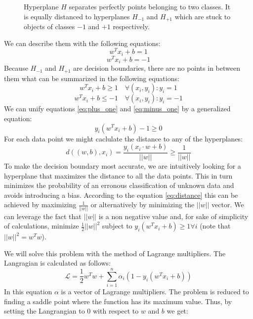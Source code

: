 \begin{figure}[htbp]
  \centering
  
  \caption{Hyperplane $H$ separates perfectly points belonging to two classes. It is equally distanced to hyperplanes $H_{-1}$ and $H_{+1}$ which are stuck to objects of classes $-1$ and $+1$ respectively.}
  \label{fig:two_hyperplanes}
\end{figure}


We can describe them with the following equations:
\begin{equation}
w^T x_i+b = 1
\end{equation}
\begin{equation}
w^T x_i+b = -1
\end{equation}
Because $H_{-1}$ and $H_{+1}$ are decision boundaries, there are no points in between them what can be summarized in the following equations:
\begin{equation} \label{eq:plus_one}
w^T x_i+b \ge 1 \quad \forall \left(x_i, y_i\right) : y_i=1
\end{equation}
\begin{equation} \label{eq:minus_one}
w^T x_i+b \le -1 \quad \forall \left(x_i, y_i\right) : y_i=-1
\end{equation}
We can unify equations \ref{eq:plus_one} and \ref{eq:minus_one} by a generalized equation:
\begin{equation}
y_i\left(w^T x_i+b\right)-1 \ge 0
\end{equation}
For each data point we might caclulate the distance to any of the hyperplanes:
\begin{equation} \label{eq:distance}
d\left(\left(w,b\right), x_i\right) = \frac{y_i\left(x_i\cdot w + b\right)}{||w||} \ge \frac{1}{||w||}
\end{equation}
To make the decision boundary most accurate, we are intuitively looking for a hyperplane that maximizes the distance to all the data points. This in turn minimizes the probability of an erronous classification of unknown data and avoids introducing a bias. According to the equation \ref{eq:distance} this can be achieved by maximizing $\frac{1}{||w||}$ or alternatively by minimizing the $||w||$ vector. We can leverage the fact that $||w||$ is a non negative value and, for sake of simplicity of calculations, minimize $\frac{1}{2}||w||^2$ subject to $y_i\left(w^T x_i+b\right) \ge 1 \forall i$ (note that $||w||^2=w^Tw$).

We will solve this problem with the method of Lagrange multipliers. The Langragian is calculated as follows:
\begin{equation}
\mathcal{L} = \frac{1}{2}w^Tw + \sum_{i=1}^{n}\alpha_i\left(1-y_i\left(w^Tx_i+b\right)\right)
\end{equation}
In this equation $\alpha$ is a vector of Lagrange multipliers. The problem is reduced to finding a saddle point where the function has its maximum value. Thus, by setting the Langrangian to 0 with respect to $w$ and $b$ we get:

